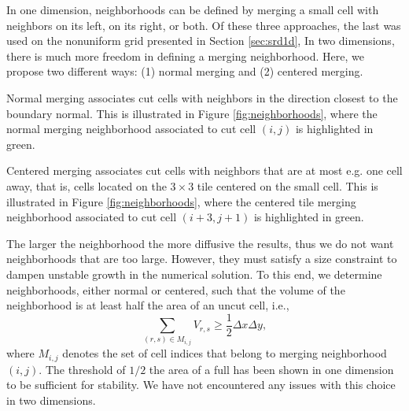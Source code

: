 


In one dimension, neighborhoods can be defined by merging a small cell with neighbors on its left, on its right, or both.  Of these three approaches, the last was used on the nonuniform grid presented in Section \ref{sec:srd1d},
In two dimensions, there is much more freedom in defining a merging neighborhood.  Here, we propose two different ways: (1) normal merging and (2) centered merging.

Normal merging associates cut cells with neighbors in the direction closest to the 
boundary normal.  This is illustrated in Figure \ref{fig:neighborhoods}, where the normal merging neighborhood associated to cut cell $(i,j)$ is highlighted in green.

Centered merging associates cut cells with neighbors that are at most e.g. one cell away, that is, cells located on the $3 \times 3$ tile centered on the small cell.  This is illustrated in Figure \ref{fig:neighborhoods}, where the centered tile merging neighborhood associated to cut cell $(i+3,j+1)$ is highlighted in green.


The larger the neighborhood the more diffusive the results, thus we do not want neighborhoods that are too large.  However, they must satisfy a size constraint to dampen unstable growth in the numerical solution. To this end, we determine neighborhoods, either normal or centered, such that the
volume of the neighborhood is at least half the area of an uncut cell, i.e., 
\begin{equation} \label{eqn:vmerge}
\sum_{(r,s) \in M_{i,j}} V_{r,s} \geq \frac{1}{2}\Delta x \Delta y,
\end{equation}
where $M_{i,j}$ denotes the set of cell indices that belong to 
merging neighborhood $(i,j)$.    
The threshold of $1/2$ the area of a full has been shown in one dimension \cite{mjb:stability2} to be 
sufficient for stability.  We have not encountered any issues with this choice in two dimensions.

